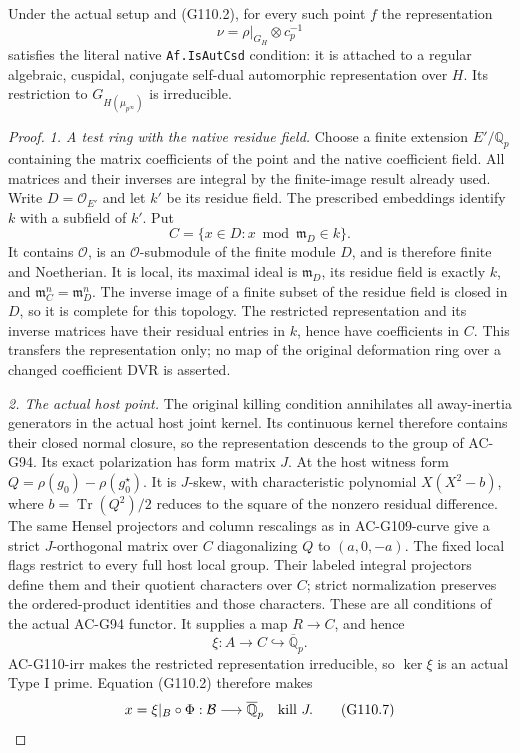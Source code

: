 \begin{theorem}
\label{AC-G110-point}
Under the actual setup and (G110.2), for every such point \(f\)
the representation
\[
               \nu=\rho|_{G_H}\otimes c_p^{-1}
 \tag{G110.4}
\]
satisfies the literal native \texttt{Af.IsAutCsd} condition:
it is attached to a regular algebraic, cuspidal, conjugate
self-dual automorphic representation over \(H\).
Its restriction to \(G_{H(\mu_{p^\infty})}\) is irreducible.
\end{theorem}
\begin{proof}
\emph{1. A test ring with the native residue field.}
Choose a finite extension \(E'/\mathbb Q_p\) containing the
matrix coefficients of the point and the native coefficient
field. All matrices and their inverses are integral by the
finite-image result already used. Write \(D=\mathcal O_{E'}\)
and let \(k'\) be its residue field. The prescribed embeddings
identify \(k\) with a subfield of \(k'\). Put
\[
               C=\{x\in D:x\bmod\mathfrak m_D\in k\}.
 \tag{G110.5}
\]
It contains \(\mathcal O\), is an \(\mathcal O\)-submodule
of the finite module \(D\), and is therefore finite and
Noetherian. It is local, its maximal ideal is
\(\mathfrak m_D\), its residue field is exactly \(k\), and
\(\mathfrak m_C^n=\mathfrak m_D^n\). The inverse image of
a finite subset of the residue field is closed in \(D\),
so it is complete for this topology. The restricted
representation and its inverse matrices have their residual
entries in \(k\), hence have coefficients in \(C\).
This transfers the representation only; no map of the
original deformation ring over a changed coefficient DVR
is asserted.

\emph{2. The actual host point.}
The original killing condition annihilates all away-inertia
generators in the actual host joint kernel. Its continuous
kernel therefore contains their closed normal closure, so
the representation descends to the group of AC-G94.
Its exact polarization has form matrix \(J\).
At the host witness form
\(Q=\rho(g_0)-\rho(g_0^\star)\).
It is \(J\)-skew, with characteristic polynomial
\(X(X^2-b)\), where \(b=\operatorname{Tr}(Q^2)/2\)
reduces to the square of the nonzero residual difference.
The same Hensel projectors and column rescalings as in
AC-G109-curve give a strict \(J\)-orthogonal matrix over
\(C\) diagonalizing \(Q\) to \((a,0,-a)\).
The fixed local flags restrict to every full host local
group. Their labeled integral projectors define them and
their quotient characters over \(C\); strict normalization
preserves the ordered-product identities and those characters.
These are all conditions of the actual AC-G94 functor.
It supplies a map \(R\to C\), and hence
\[
              \xi:A\longrightarrow C
                       \hookrightarrow\overline{\mathbb Q}_p.
 \tag{G110.6}
\]
AC-G110-irr makes the restricted representation irreducible,
so \(\ker\xi\) is an actual Type I prime. Equation
(G110.2) therefore makes
\[
              x=\xi|_B\circ\Phi:
                 \mathcal B\longrightarrow\overline{\mathbb Q}_p
                    \quad\hbox{kill }J.
 \tag{G110.7}
\]


\end{proof}
